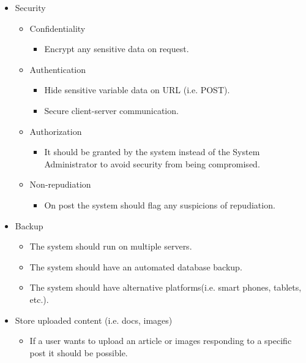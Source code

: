 \begin{itemize}	
		\item Security
			\begin{itemize}
				\item Confidentiality 
					\begin{itemize}
						\item Encrypt any sensitive data on request.  
					\end{itemize}
						
				\item Authentication 
					\begin{itemize}
						\item Hide sensitive variable data on URL (i.e. POST).
						\item Secure client-server communication.   
					\end{itemize}

				\item Authorization 
					\begin{itemize}
						\item It should be granted by the system instead of the System Administrator to avoid security from being compromised.    
					\end{itemize}
					
				\item Non-repudiation
					\begin{itemize}
						\item On post the system should flag any suspicions of repudiation.     
					\end{itemize}					
			\end{itemize}
			
		\item Backup
		  \begin{itemize}
			  \item The system should run on multiple servers.
			  \item The system should have an automated database backup.
			  \item The system should have alternative platforms(i.e. smart phones, tablets, etc.).
		  \end{itemize}					
		  
		\item Store uploaded content (i.e. docs, images)
		  \begin{itemize}
			  \item If a user wants to upload an article or images responding to a specific post it should be possible.
		  \end{itemize}					
		
\end{itemize}